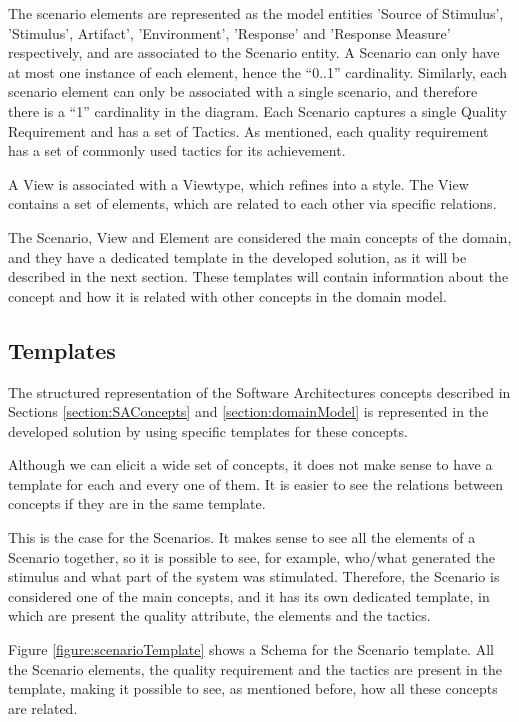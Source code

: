 \documentclass{llncs}
\begin{document}
The scenario elements are represented as the model entities 'Source of Stimulus', 'Stimulus', Artifact', 'Environment', 'Response' and 'Response Measure' respectively, and are associated to the Scenario entity. A Scenario can only have at most one instance of each element, hence the ``0..1'' cardinality. Similarly, each scenario element can only be associated with a single scenario, and therefore there is a ``1'' cardinality in the diagram. Each Scenario captures a single Quality Requirement and has a set of Tactics. As mentioned, each quality requirement has a set of commonly used tactics for its achievement.

A View is associated with a Viewtype, which refines into a style. The View contains a set of elements, which are related to each other via specific relations.

The Scenario, View and Element are considered the main concepts of the domain, and they have a dedicated template in the developed solution, as it will be described in the next section. These templates will contain information about the concept and how it is related with other concepts in the domain model.

\subsection{Templates}
\label{section:templates}
The structured representation of the Software Architectures concepts described in Sections \ref{section:SAConcepts} and \ref{section:domainModel} is represented in the developed solution by using specific templates for these concepts.

Although we can elicit a wide set of concepts, it does not make sense to have a template for each and every one of them. It is easier to see the relations between concepts if they are in the same template. 

This is the case for the Scenarios. It makes sense to see all the elements of a Scenario together, so it is possible to see, for example, who/what generated the stimulus and what part of the system was stimulated. Therefore, the Scenario is considered one of the main concepts, and it has its own dedicated template, in which are present the quality attribute, the elements and the tactics. 

Figure \ref{figure:scenarioTemplate} shows a Schema for the Scenario template. All the Scenario elements, the quality requirement and the tactics are present in the template, making it possible to see, as mentioned before, how all these concepts are related.
\end{document}
